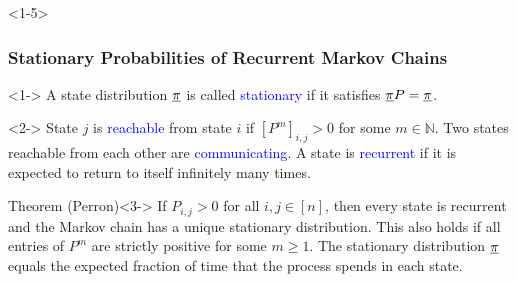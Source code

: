 \documentclass[10pt,english,aspectratio=169]{beamer}
\begin{document}
\begin{frame}<1-5> \frametitle{Stationary Probabilities of Recurrent Markov Chains}

\begin{definition}<1->
A state distribution $\underline{\pi}$ is called \textcolor{blue}{stationary} if it satisfies $\underline{\pi}P=\underline{\pi}$.
\end{definition}

\begin{definition}<2->
State $j$ is \textcolor{blue}{reachable} from state $i$ if $[P^m]_{i,j} >0$ for some $m\in \mathbb{N}$.
Two states reachable from each other are \textcolor{blue}{communicating}.
A state is \textcolor{blue}{recurrent} if it is expected to return to itself infinitely many times.

\end{definition}

\begin{exampleblock}{Theorem (Perron)}<3->
If $P_{i,j}>0$ for all $i,j\in[n]$, then every state is recurrent and the Markov chain has a unique stationary distribution. This also holds if all entries of $P^m$ are strictly positive for some $m\geq 1$. The stationary distribution $\underline{\pi}$ equals the expected fraction of time that the process spends in each state.
\end{exampleblock}




\end{frame}
\end{document}
